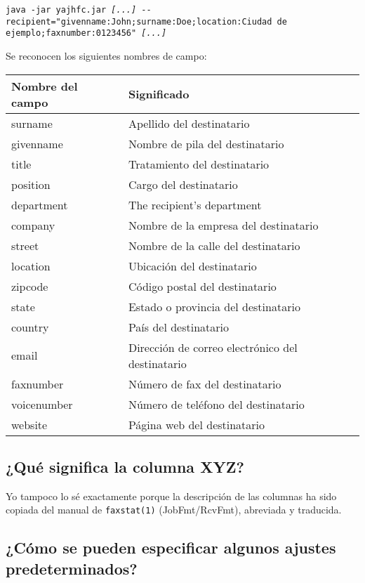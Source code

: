 \documentclass[a4paper,10pt]{scrartcl}
\begin{document}
\texttt{java -jar yajhfc.jar \textit{[...]} -{-}recipient="givenname:John;surname:Doe;location:Ciudad de ejemplo;faxnumber:0123456" \textit{[...]}}

Se reconocen los siguientes nombres de campo:
\begin{center}
\begin{tabular}{|l|p{}|}
\hline
\bfseries Nombre del campo & \bfseries Significado \\
\hline\hline
\ttfamily surname & Apellido del destinatario\\\hline
\ttfamily givenname & Nombre de pila del destinatario \\\hline
\ttfamily title & Tratamiento del destinatario \\\hline
\ttfamily position & Cargo del destinatario \\\hline
\ttfamily department & The recipient's department\\\hline
\ttfamily company & Nombre de la empresa del destinatario\\\hline
\ttfamily street & Nombre de la calle del destinatario \\\hline
\ttfamily location & Ubicación del destinatario\\\hline
\ttfamily zipcode & Código postal del destinatario \\\hline
\ttfamily state & Estado o provincia del destinatario\\\hline
\ttfamily country & País del destinatario\\\hline
\ttfamily email & Dirección de correo electrónico del destinatario\\\hline
\ttfamily faxnumber & Número de fax del destinatario \\\hline
\ttfamily voicenumber & Número de teléfono del destinatario \\\hline
\ttfamily website & Página web del destinatario\\\hline
\end{tabular}
\end{center}

\subsection{¿Qué significa la columna XYZ?}

Yo tampoco lo sé exactamente porque la descripción de las columnas ha sido copiada del manual de \verb#faxstat(1)# (JobFmt/RcvFmt), abreviada y traducida.

\subsection{¿Cómo se pueden especificar algunos ajustes predeterminados?}
\end{document}

